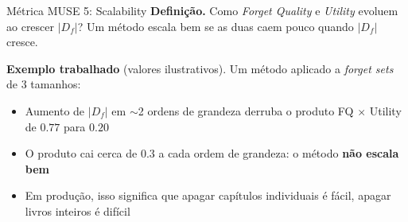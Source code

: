 \documentclass[aspectratio=169,xcolor=dvipsnames]{beamer}
\begin{document}
  \begin{frame}{Métrica MUSE 5: Scalability}
    \textbf{Definição.} Como \textit{Forget Quality} e \textit{Utility} evoluem ao crescer $|D_f|$? Um método escala bem se as duas caem pouco quando $|D_f|$ cresce.

    \vspace{0.3em}
    \textbf{Exemplo trabalhado} (valores ilustrativos). Um método aplicado a \textit{forget sets} de 3 tamanhos:

    \centering

    \vspace{0.3em}
    \begin{itemize}\setlength{\itemsep}{0pt}\footnotesize
      \item Aumento de $|D_f|$ em $\sim$2 ordens de grandeza derruba o produto FQ $\times$ Utility de $0.77$ para $0.20$
      \item O produto cai cerca de $0.3$ a cada ordem de grandeza: o método \textbf{não escala bem}
      \item Em produção, isso significa que apagar capítulos individuais é fácil, apagar livros inteiros é difícil
    \end{itemize}
  \end{frame}
\end{document}
